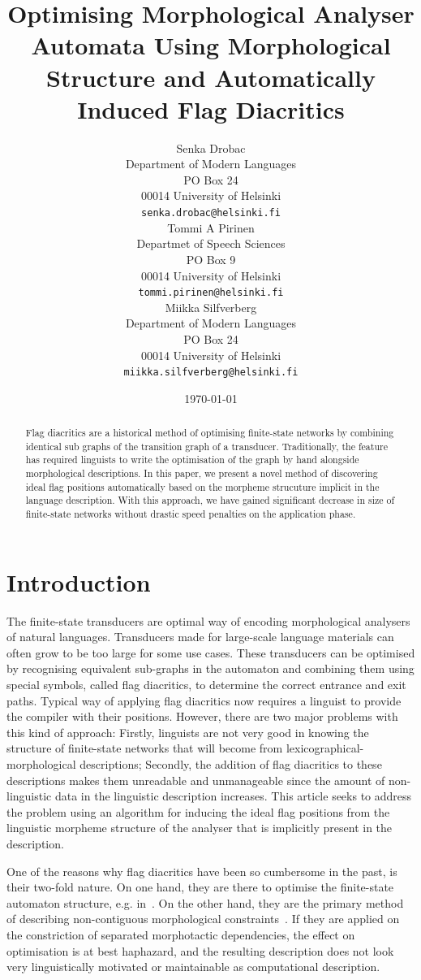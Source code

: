 \documentclass[11pt]{article}
\title{Optimising Morphological Analyser Automata Using Morphological Structure
and Automatically Induced Flag Diacritics}
\author{Senka Drobac \\
Department of Modern Languages \\
PO Box 24 \\
00014 University of Helsinki \\
  {\tt senka.drobac@helsinki.fi} \\\And
  Tommi A Pirinen \\
Departmet of Speech Sciences\\
PO Box 9\\
00014 University of Helsinki\\
  {\tt tommi.pirinen@helsinki.fi} \\\And
  Miikka Silfverberg \\
  Department of Modern Languages \\
	PO Box 24 \\
	00014 University of Helsinki \\
	{\tt miikka.silfverberg@helsinki.fi} \\}
\date{\today}
\begin{document}
\maketitle
\begin{abstract}
    Flag diacritics are a historical method of optimising finite-state networks
    by combining identical sub graphs of the transition graph of a transducer. Traditionally, the
    feature has required linguists to write the optimisation of the graph by
    hand alongside morphological descriptions. In this paper, we present a novel
    method of discovering ideal flag positions automatically based on the
    morpheme strucuture implicit in the language description. With this
    approach, we have gained significant decrease in size of finite-state networks
    without drastic speed penalties on the application phase.
\end{abstract}

\section{Introduction}

The finite-state transducers are optimal way of encoding morphological analysers
of natural languages. Transducers made for large-scale language materials can
often grow to be too large for some use cases. These transducers can be optimised
by recognising equivalent sub-graphs in the automaton and combining them using
special symbols, called flag diacritics, to determine the correct entrance and
exit paths. Typical way of applying flag diacritics now requires a linguist to
provide the compiler with their positions. However, there are two
major problems with this kind of approach: Firstly, linguists are not very good
in knowing the structure of finite-state networks that will become from
lexicographical-morphological descriptions; Secondly, the addition of flag
diacritics to these descriptions makes them unreadable and unmanageable since
the amount of non-linguistic data in the linguistic description increases. This
article seeks to address the problem using an algorithm for inducing the ideal
flag positions from the linguistic morpheme structure of the analyser that is
implicitly present in the description. 

One of the reasons why flag diacritics have been so cumbersome in the past,
is their two-fold nature. On one hand, they are there to optimise the
finite-state automaton structure, e.g. in~\cite{karttunen2006numbers}. On the
other hand, they are the primary method of describing non-contiguous 
morphological constraints~\cite{beesley1998constraining}. If they are applied
on the constriction of separated morphotactic dependencies, the effect on
optimisation is at best haphazard, and the resulting description does not
look very linguistically motivated or maintainable as computational description.
\end{document}
